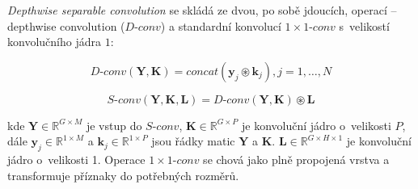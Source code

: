\textit{Depthwise separable convolution} se skládá ze dvou, po sobě jdoucích, operací -- depthwise convolution ($D\texttt{-}conv$) a standardní konvolucí $1 \times 1 \texttt{-}conv$ s~velikostí konvolučního jádra $1$:

\begin{equation}
	D\texttt{-}conv(\boldsymbol{Y}, \boldsymbol{K}) = concat(\boldsymbol{y}_j \circledast \boldsymbol{k}_j), j = 1, \dots, N
\end{equation}

\begin{equation}
	S\texttt{-}conv(\boldsymbol{Y}, \boldsymbol{K}, \boldsymbol{L}) = D\texttt{-}conv(\boldsymbol{Y}, \boldsymbol{K}) \circledast \boldsymbol{L}
\end{equation}

kde $\boldsymbol{Y} \in \mathbb{R}^{G \times M}$ je vstup do $S\texttt{-}conv$, $\boldsymbol{K} \in \mathbb{R}^{G \times P}$ je konvoluční jádro o~velikosti $P$, dále $\boldsymbol{y}_j \in \mathbb{R}^{1 \times M}$ a $\boldsymbol{k}_j \in \mathbb{R}^{1 \times P}$ jsou řádky matic $\boldsymbol{Y}$ a $\boldsymbol{K}$. $\boldsymbol{L} \in \mathbb{R}^{G \times H \times 1}$ je konvoluční jádro o~velikosti 1. Operace $1 \times 1 \texttt{-}conv$ se chová jako plně propojená vrstva a transformuje příznaky do potřebných rozměrů.

